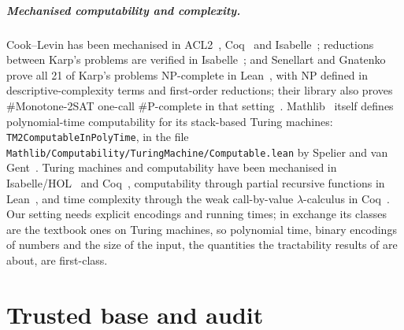 \documentclass[pdflatex,sn-mathphys-num]{sn-jnl}
\theoremstyle{thmstyleone}
\theoremstyle{thmstylethree}
\begin{document}
\subparagraph*{Mechanised computability and complexity.}
Cook--Levin has been mechanised in ACL2~\cite{GamboaCowles2004}, Coq~\cite{GaeherKunze2021} and
Isabelle~\cite{Cook_Levin-AFP}; reductions between Karp's problems are verified in
Isabelle~\cite{PolyReductionsIsabelle}; and Senellart and Gnatenko prove all 21 of Karp's
problems NP-complete in Lean~\cite{SenellartGnatenko2026}, with NP defined in
descriptive-complexity terms and first-order reductions; their library also proves
\#Monotone-2SAT one-call \#P-complete in that setting~\cite{DescriptiveComplexityLib}. Mathlib~\cite{mathlib2020} itself defines polynomial-time
computability for its stack-based Turing machines: \lstinline{TM2ComputableInPolyTime}, in the
file \texttt{Mathlib/Computability/TuringMachine/Computable.lean} by Spelier and van
Gent~\cite{MathlibTMComputable}. Turing machines
and computability have been mechanised in Isabelle/HOL~\cite{XuZhangUrban2013} and Coq~\cite{ForsterKunzeWuttke2020}, computability through
partial recursive functions in Lean~\cite{Carneiro2019}, and time complexity through the weak
call-by-value $\lambda$-calculus in Coq~\cite{ForsterKSW2021}. Our setting needs explicit
encodings and running times; in exchange its classes are the textbook ones on Turing machines,
so polynomial time, binary encodings of numbers and the size of the input, the quantities the
tractability results of  are about, are first-class.

\section{Trusted base and audit}
\label{sec:formal}
\end{document}
